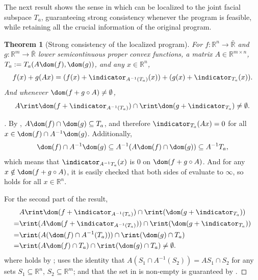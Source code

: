 \documentclass{article}
\theoremstyle{plain}
\newtheorem{theorem}{Theorem}[section]
\theoremstyle{definition}
\theoremstyle{remark}
\begin{document}
The next result shows the sense in which 
can be localized to the joint facial subspace $T_a$, guaranteeing strong consistency whenever the program is feasible,
while retaining all the crucial information of the original program.
\begin{theorem}[Strong consistency of the localized program]
\label{loc:strong_consistency_of_the_localized_program.statement}
For $f:\mathbb{R}^n\to \bar{\mathbb{R}}$ and $g:\mathbb{R}^m \to \bar{\mathbb{R}}$ lower
semicontinuous proper convex functions,
a matrix $A  \in \mathbb{R}^{m  \times n}$, $T_a := T_a(A \dom(f),  \dom(g))$,
and any $x \in \mathbb{R}^n$,
\begin{equation}
\label{eq:myfn:equiv}
f(x)+ g(Ax) = (f(x) + \indicator_{A^{-1}(T_a)}(x)) + (g(x) + \indicator_{T_a}(x)).
\end{equation}
And whenever $\dom(f + g \circ A) \neq \emptyset$, 
\begin{equation*}
A\rint\dom(f + \indicator_{A^{-1}(T_a)}) \cap \rint\dom(g + \indicator_{T_a}) \neq \emptyset.
\end{equation*}
\end{theorem}
\begin{proof}[\hypertarget{loc:strong_consistency_of_the_localized_program.proof}Proof of \Cref{loc:strong_consistency_of_the_localized_program.statement}]

By ,
$A \dom(f) \cap \dom(g) \subseteq T_a$,
and therefore $\indicator_{T_a}(Ax) = 0$ for all $x \in \dom(f) \cap A^{-1} \dom(g)$.
Additionally,
\begin{equation*}
\dom(f) \cap A^{-1} \dom(g) \subseteq A^{-1}(A\dom(f) \cap \dom(g)) \subseteq A^{-1} T_a,
\end{equation*}
which means that $\indicator_{A^{-1} T_a}(x)$ is $0$ on $\dom(f + g \circ A)$.
And for any $x \notin \dom(f+ g \circ A)$, it is easily checked that
both sides of  evaluate to $\infty$, so  holds for
all $x \in \mathbb{R}^n$.

For the second part of the result,
\begin{align}
&A\rint\dom(f + \indicator_{A^{-1}(T_a)}) \cap \rint(\dom(g + \indicator_{T_a})) \label{eq:ali:1}\\
 = &\rint(A\dom(f + \indicator_{A^{-1}(T_a)})) \cap \rint(\dom(g + \indicator_{T_a})) \label{eq:ali:2}\\
 = &\rint(A(\dom(f) \cap A^{-1}(T_a))) \cap \rint(\dom(g) \cap T_a) \label{eq:ali:3}\\
 = &\rint(A\dom(f) \cap T_a) \cap \rint(\dom(g) \cap T_a) \neq \emptyset. \label{eq:ali:4}
\end{align}
where  holds by \cite[Theorem 6.6]{rockafellarConvexAnalysis1970};
 uses the identity that $A(S_1 \cap  A^{-1}(S_2)) =  A S_1 \cap S_2$
for any sets $S_1 \subseteq \mathbb{R}^n$, $S_2 \subseteq \mathbb{R}^m$;
and that the set in  is non-empty is guaranteed by 
.
\end{proof}
\end{document}
